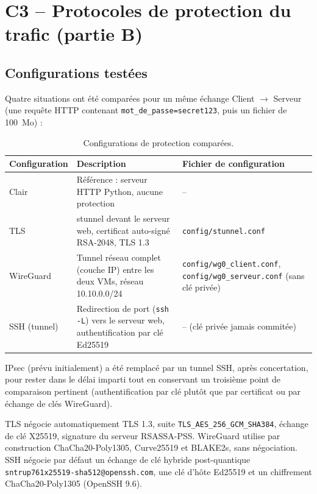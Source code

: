 \documentclass[11pt,a4paper]{article}
\newcommand{\fic}[1]{\texttt{#1}}
\begin{document}
\section{C3 -- Protocoles de protection du trafic (partie B)}

\subsection{Configurations testées}
Quatre situations ont été comparées pour un même échange Client $\rightarrow$ Serveur (une requête
HTTP contenant \texttt{mot\_de\_passe=secret123}, puis un fichier de 100~Mo) :

\begin{table}[H]
\centering
\begin{tabularx}{\textwidth}{l Y Y}
\toprule
\textbf{Configuration} & \textbf{Description} & \textbf{Fichier de configuration} \\
\midrule
Clair & Référence : serveur HTTP Python, aucune protection & -- \\
TLS & stunnel devant le serveur web, certificat auto-signé RSA-2048, TLS 1.3 & \fic{config/stunnel.conf} \\
WireGuard & Tunnel réseau complet (couche IP) entre les deux VMs, réseau 10.10.0.0/24 & \fic{config/wg0\_client.conf}, \fic{config/wg0\_serveur.conf} (sans clé privée) \\
SSH (tunnel) & Redirection de port (\texttt{ssh -L}) vers le serveur web, authentification par clé Ed25519 & -- (clé privée jamais commitée) \\
\bottomrule
\end{tabularx}
\caption{Configurations de protection comparées.}
\end{table}

IPsec (prévu initialement) a été remplacé par un tunnel SSH, après concertation, pour rester dans
le délai imparti tout en conservant un troisième point de comparaison pertinent (authentification
par clé plutôt que par certificat ou par échange de clés WireGuard).

TLS négocie automatiquement TLS 1.3, suite \texttt{TLS\_AES\_256\_GCM\_SHA384}, échange de clé X25519,
signature du serveur RSASSA-PSS. WireGuard utilise par construction ChaCha20-Poly1305, Curve25519
et BLAKE2s, sans négociation. SSH négocie par défaut un échange de clé hybride post-quantique
\texttt{sntrup761x25519-sha512@openssh.com}, une clé d'hôte Ed25519 et un chiffrement
ChaCha20-Poly1305 (OpenSSH 9.6).
\end{document}
